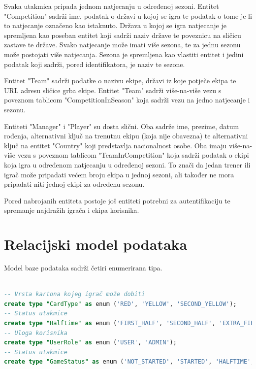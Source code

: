\documentclass[times, utf8, zavrsni]{fer}
\begin{document}
Svaka utakmica pripada jednom natjecanju u određenoj sezoni.
Entitet "Competition" sadrži ime, podatak o državi u kojoj se igra te podatak o tome je li to natjecanje označeno kao istaknuto.
Država u kojoj se igra natjecanje je spremljena kao poseban entitet koji sadrži naziv države te poveznicu na sličicu zastave te države.
Svako natjecanje može imati više sezona, te za jednu sezonu može postojati više natjecanja.
Sezona je spremljena kao vlastiti entitet i jedini podatak koji sadrži, pored identifikatora, je naziv te sezone.

Entitet "Team" sadrži podatke o nazivu ekipe, državi iz koje potječe ekipa te URL adresu sličice grba ekipe.
Entitet "Team" sadrži više-na-više vezu s poveznom tablicom "CompetitionInSeason" koja sadrži vezu na jedno natjecanje i sezonu.

Entiteti "Manager" i "Player" su dosta slični. Oba sadrže ime, prezime, datum rođenja, alternativni ključ na trenutnu ekipu (koja nije obavezna) te alternativni ključ na entitet "Country" koji predstavlja nacionalnost osobe.
Oba imaju više-na-više vezu s poveznom tablicom "TeamInCompetition" koja sadrži podatak o ekipi koja igra u određenom natjecanju u određenoj sezoni.
To znači da jedan trener ili igrač može pripadati većem broju ekipa u jednoj sezoni, ali također ne mora pripadati niti jednoj ekipi za određenu sezonu.

Pored nabrojanih entiteta postoje još entiteti potrebni za autentifikaciju te spremanje najdražih igrača i ekipa korisnika.

\section{Relacijski model podataka}

Model baze podataka sadrži četiri enumerirana tipa.
\begin{lstlisting}[caption=Enumerirani tipovi, language=SQL, numbers=none]

-- Vrsta kartona kojeg igrač može dobiti
create type "CardType" as enum ('RED', 'YELLOW', 'SECOND_YELLOW');
-- Status utakmice
create type "Halftime" as enum ('FIRST_HALF', 'SECOND_HALF', 'EXTRA_FIRST_HALF', 'EXTRA_SECOND_HALF');
-- Uloga korisnika
create type "UserRole" as enum ('USER', 'ADMIN');
-- Status utakmice
create type "GameStatus" as enum ('NOT_STARTED', 'STARTED', 'HALFTIME', 'OVER');

\end{lstlisting}
\end{document}
